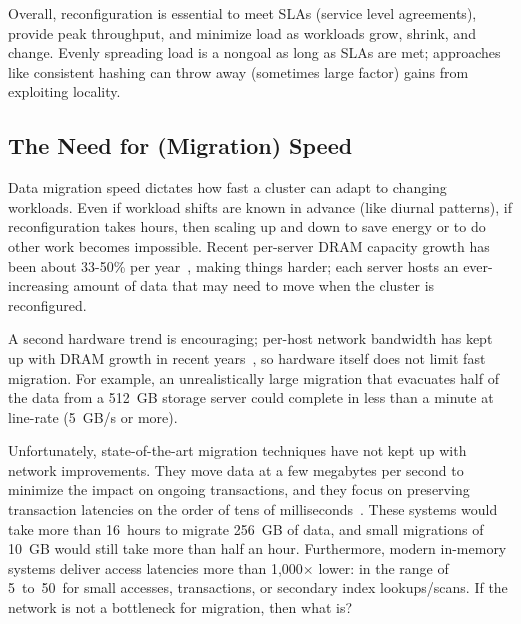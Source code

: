 Overall, reconfiguration is essential to meet SLAs (service level agreements), provide peak throughput,
and minimize load as workloads grow, shrink, and change. Evenly spreading load
is a nongoal as long as SLAs are met; approaches like consistent
hashing can throw away (sometimes large factor) gains from exploiting locality.

\subsection{The Need for (Migration) Speed}

Data migration speed dictates how fast a cluster can adapt to changing
workloads.  Even if workload shifts are known in advance (like
diurnal patterns), if reconfiguration takes hours, then scaling up and down to
save energy or to do other work becomes impossible.
Recent per-server DRAM capacity growth has been about 33-50\%
per year~\cite{computer-architecture}, making things harder; each server
hosts an ever-increasing amount of
data that may need to move when the cluster is reconfigured.


A second hardware trend is encouraging; per-host network bandwidth has kept up
with DRAM growth in recent years~\cite{ethernet}, so hardware
itself does not limit fast migration.  For example, an unrealistically large
migration that evacuates half of the data from a 512~GB storage server could
complete in less than a minute at line-rate (5~GB/s or more).


Unfortunately, state-of-the-art migration techniques have not kept up
with network improvements. They move data at a few megabytes per second
to minimize the impact on ongoing transactions, and they focus on preserving
transaction latencies on the order of tens of milliseconds~\cite{squall}.
These systems would take more than 16~hours to
migrate 256~GB of data, and small migrations of 10~GB would still take
more than half an hour. Furthermore, modern in-memory systems deliver access
latencies more than 1,000$\times$ lower: in the range of 5~to~50~\us for small
accesses, transactions, or secondary index lookups/scans. If the network
is not a
bottleneck for migration, then what is?

